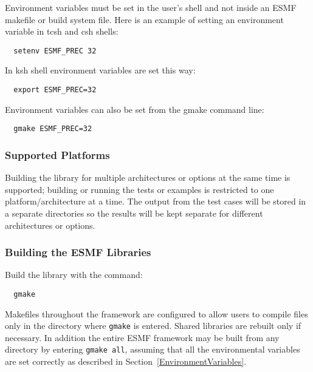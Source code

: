 Environment variables must be set in the user's shell and not
inside an ESMF makefile or build system file.  Here is an example 
of setting an environment variable in tcsh and csh shells:

\begin{verbatim}
  setenv ESMF_PREC 32
\end{verbatim}

In ksh shell environment variables are set this way:

\begin{verbatim}
  export ESMF_PREC=32
\end{verbatim}

Environment variables can also be set from the gmake command line:

\begin{verbatim}
  gmake ESMF_PREC=32
\end{verbatim}

\subsubsection{Supported Platforms}


Building the library for multiple architectures or options at the same
time is supported; building or running the tests or examples is restricted
to one platform/architecture at a time.  The output from the test cases
will be stored in a separate directories so the results will be kept 
separate for different architectures or options.

\subsubsection{Building the ESMF Libraries}
\label{BuildESMF}



Build the library with the command:
\begin{verbatim}
  gmake 
\end{verbatim}


Makefiles throughout the framework are configured to allow users to
compile files only in the directory where {\tt gmake} is entered. Shared
libraries are rebuilt only if necessary. In addition the entire ESMF
framework may be built from any directory by entering {\tt gmake all},
assuming that all the environmental variables are set correctly as
described in Section~\ref{EnvironmentVariables}.

